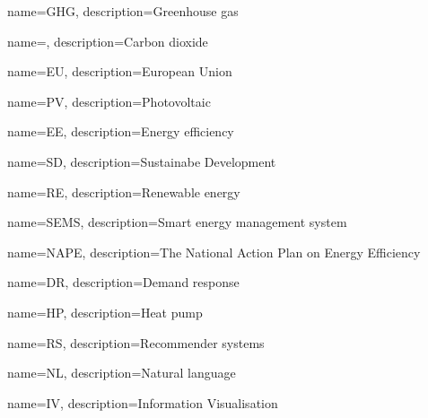 \makeglossaries

{
    name=GHG,
    description={Greenhouse gas}
}

{
    name=,
    description={Carbon dioxide}
}

{
    name=EU,
    description={European Union}
}

{
    name=PV,
    description={Photovoltaic}
}

{
    name=EE,
    description={Energy efficiency}
}

{
    name=SD,
    description={Sustainabe Development}
}

{
    name=RE,
    description={Renewable energy}
}

{
    name=SEMS,
    description={Smart energy management system}
}

{
    name=NAPE,
    description={The National Action Plan on Energy Efficiency}
}

{
    name=DR,
    description={Demand response}
}

{
    name=HP,
    description={Heat pump}
}

{
    name=RS,
    description={Recommender systems}
}

{
    name=NL,
    description={Natural language}
}

{
    name=IV,
    description={Information Visualisation}
}
